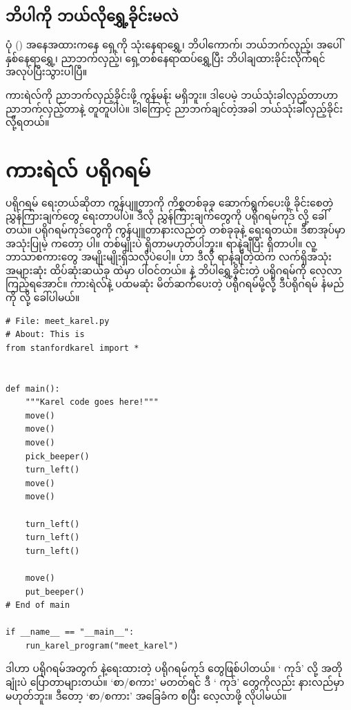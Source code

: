 \subsection*{ဘိပါကို ဘယ်လိုရွှေ့ခိုင်းမလဲ}
ပုံ (\fRefNo{\ref{fig:meet_karel_1}}) အနေအထားကနေ ရှေ့ကို သုံးနေရာရွှေ့၊ ဘိပါကောက်၊ ဘယ်ဘက်လှည့်၊ အပေါ် နှစ်နေရာရွှေ့၊ ညာဘက်လှည့်၊ ရှေ့တစ်နေရာထပ်ရွှေ့ပြီး ဘိပါချထားခိုင်းလိုက်ရင် အလုပ်ပြီးသွားပါပြီ။

ကားရဲလ်ကို ညာဘက်လှည့်ခိုင်းဖို့  ကွန်မန်း မရှိဘူး။ ဒါပေမဲ့ ဘယ်သုံးခါလှည့်တာဟာ ညာဘက်လှည့်တာနဲ့ တူတူပါပဲ။ ဒါကြောင့် ညာဘက်ချင်တဲ့အခါ ဘယ်သုံးခါလှည့်ခိုင်းလို့ရတယ်။

\section{ကားရဲလ် ပရိုဂရမ်}
ပရိုဂရမ် ရေးတယ်ဆိုတာ ကွန်ပျူတာကို ကိစ္စတစ်ခုခု ဆောက်ရွက်ပေးဖို့ ခိုင်းစေတဲ့  ညွှန်ကြားချက်တွေ ရေးတာပါပဲ။ ဒီလို ညွှန်ကြားချက်တွေကို ပရိုဂရမ်ကုဒ်  လို့ ခေါ်တယ်။ ပရိုဂရမ်ကုဒ်တွေကို ကွန်ပျူတာနားလည်တဲ့  တစ်ခုခုနဲ့ ရေးရတယ်။ ဒီစာအုပ်မှာ အသုံးပြုမဲ့  ကတော့  ပါ။  တစ်မျိုးပဲ ရှိတာမဟုတ်ပါဘူး။ ရာနဲ့ချီပြီး ရှိတာပါ။ လူ့ဘာသာစကားတွေ အမျိုးမျိုးရှိသလိုပဲပေါ့။  ဟာ ဒီလို ရာနဲ့ချီတဲ့ထဲက လက်ရှိအသုံးအများဆုံး ထိပ်ဆုံးဆယ်ခု ထဲမှာ ပါဝင်တယ်။  နဲ့ ဘိပါရွှေ့ခိုင်းတဲ့ ပရိုဂရမ်ကို လေ့လာကြည့်ရအောင်။ ကားရဲလ်နဲ့ ပထမဆုံး မိတ်ဆက်ပေးတဲ့ ပရိုဂရမ်မို့လို့ ဒီပရိုဂရမ် နံမည်ကို  လို့ ခေါ်ပါမယ်။
%
\setlength{\fboxsep}{0pt}
\begin{verbatim}
# File: meet_karel.py
# About: This is
from stanfordkarel import *


def main():
    """Karel code goes here!"""
    move()
    move()
    move()
    pick_beeper()
    turn_left()
    move()
    move()

    turn_left()
    turn_left()
    turn_left()

    move()
    put_beeper()
# End of main

if __name__ == "__main__":
    run_karel_program("meet_karel")

\end{verbatim}
%

ဒါဟာ  ပရိုဂရမ်အတွက်  နဲ့ရေးထားတဲ့ ပရိုဂရမ်ကုဒ် တွေဖြစ်ပါတယ်။ ‘ ကုဒ်’ လို့ အတိုချုံးပဲ ပြောတာများတယ်။  ‘စာ/စကား’ မတတ်ရင် ဒီ ‘ ကုဒ်’ တွေကိုလည်း နားလည်မှာ မဟုတ်ဘူး။ ဒီတော့  ‘စာ/စကား’ အခြေခံက စပြီး လေ့လာဖို့ လိုပါမယ်။

